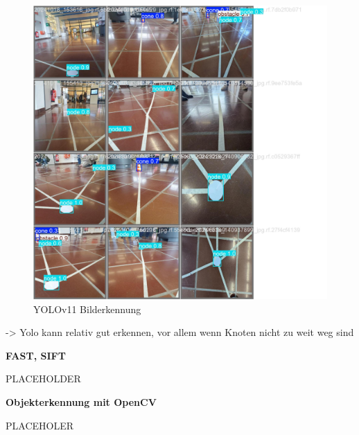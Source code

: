 \begin{figure}[H]
\centering
\includegraphics[width=\textwidth -30mm]{assets/informatik-prototyp/yolo/recognized-images.jpeg}
\caption{YOLOv11 Bilderkennung}
\label{fig:img-recognition-yolo}
\end{figure}

-> Yolo kann relativ gut erkennen, vor allem wenn Knoten nicht zu weit weg sind


\textbf{FAST, SIFT}

PLACEHOLDER

\textbf{Objekterkennung mit OpenCV}

PLACEHOLER